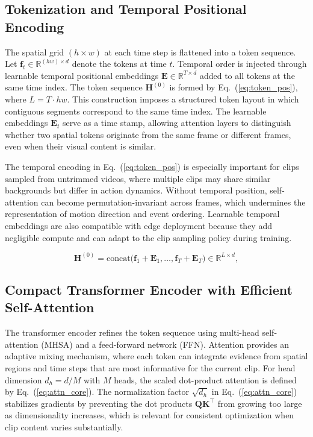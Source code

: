 \documentclass[AMA,Times1COL]{WileyNJDv5} %
\begin{document}
\subsection{Tokenization and Temporal Positional Encoding}
The spatial grid $(h\times w)$ at each time step is flattened into a token sequence. Let $\mathbf{f}_t \in \mathbb{R}^{(hw)\times d}$ denote the tokens at time $t$. Temporal order is injected through learnable temporal positional embeddings $\mathbf{E}\in\mathbb{R}^{T\times d}$ added to all tokens at the same time index. The token sequence $\mathbf{H}^{(0)}$ is formed by Eq.~(\ref{eq:token_pos}), where $L=T\cdot hw$. This construction imposes a structured token layout in which contiguous segments correspond to the same time index. The learnable embeddings $\mathbf{E}_t$ serve as a time stamp, allowing attention layers to distinguish whether two spatial tokens originate from the same frame or different frames, even when their visual content is similar.

The temporal encoding in Eq.~(\ref{eq:token_pos}) is especially important for clips sampled from untrimmed videos, where multiple clips may share similar backgrounds but differ in action dynamics. Without temporal position, self-attention can become permutation-invariant across frames, which undermines the representation of motion direction and event ordering. Learnable temporal embeddings are also compatible with edge deployment because they add negligible compute and can adapt to the clip sampling policy during training.

\begin{equation}
\mathbf{H}^{(0)} = \mathrm{concat}\Big(\mathbf{f}_1+\mathbf{E}_1,\dots,\mathbf{f}_T+\mathbf{E}_T\Big) \in \mathbb{R}^{L\times d},
\label{eq:token_pos}
\end{equation}

\subsection{Compact Transformer Encoder with Efficient Self-Attention}
The transformer encoder refines the token sequence using multi-head self-attention (MHSA) and a feed-forward network (FFN). Attention provides an adaptive mixing mechanism, where each token can integrate evidence from spatial regions and time steps that are most informative for the current clip. For head dimension $d_h=d/M$ with $M$ heads, the scaled dot-product attention is defined by Eq.~(\ref{eq:attn_core}). The normalization factor $\sqrt{d_h}$ in Eq.~(\ref{eq:attn_core}) stabilizes gradients by preventing the dot products $\mathbf{Q}\mathbf{K}^\top$ from growing too large as dimensionality increases, which is relevant for consistent optimization when clip content varies substantially.
\end{document}
